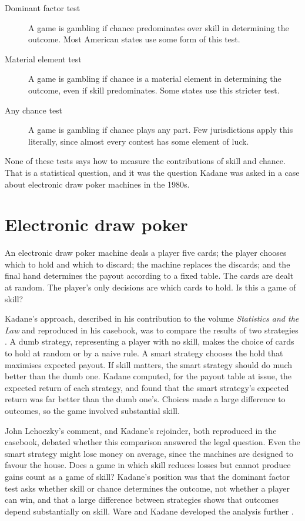 \begin{description}
\item[Dominant factor test] A game is gambling if chance predominates over skill in determining the outcome. Most American states use some form of this test.
\item[Material element test] A game is gambling if chance is a material element in determining the outcome, even if skill predominates. Some states use this stricter test.
\item[Any chance test] A game is gambling if chance plays any part. Few jurisdictions apply this literally, since almost every contest has some element of luck.
\end{description}
None of these tests says how to measure the contributions of skill and chance. That is a statistical question, and it was the question Kadane was asked in a case about electronic draw poker machines in the 1980s.

\section{Electronic draw poker}

An electronic draw poker machine deals a player five cards; the player chooses which to hold and which to discard; the machine replaces the discards; and the final hand determines the payout according to a fixed table. The cards are dealt at random. The player's only decisions are which cards to hold. Is this a game of skill?

Kadane's approach, described in his contribution to the volume \emph{Statistics and the Law} and reproduced in his casebook, was to compare the results of two strategies \citep{kadane1986,kadane2008}. A dumb strategy, representing a player with no skill, makes the choice of cards to hold at random or by a naive rule. A smart strategy chooses the hold that maximises expected payout. If skill matters, the smart strategy should do much better than the dumb one. Kadane computed, for the payout table at issue, the expected return of each strategy, and found that the smart strategy's expected return was far better than the dumb one's. Choices made a large difference to outcomes, so the game involved substantial skill.

John Lehoczky's comment, and Kadane's rejoinder, both reproduced in the casebook, debated whether this comparison answered the legal question. Even the smart strategy might lose money on average, since the machines are designed to favour the house. Does a game in which skill reduces losses but cannot produce gains count as a game of skill? Kadane's position was that the dominant factor test asks whether skill or chance determines the outcome, not whether a player can win, and that a large difference between strategies shows that outcomes depend substantially on skill. Ware and Kadane developed the analysis further \citep{kadane2008}.

